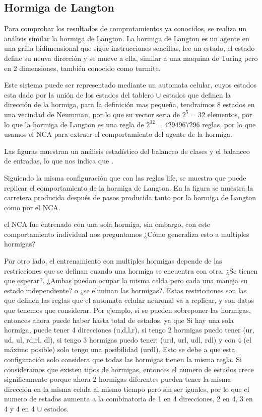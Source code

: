 \subsection{Hormiga de Langton}\label{sec:exp1_langton}

Para comprobar los resultados de comprotamientos ya conocidos, se realiza un análisis similar la hormiga de Langton. La hormiga de Langton es un agente en una grilla bidimensional que sigue instrucciones sencillas, lee un estado, el estado define su neuva dirección y se mueve a ella, similar a una maquina de Turing pero en 2 dimensiones, también conocido como turmite.

Este sistema puede ser representado mediante un automata celular, cuyos estados esta dado por la unión de los estados del tablero $\cup$ estados que definen la dirección de la hormiga, para la definición mas pequeña, tendraimos 8 estados en una vecindad de Neumman, por lo que su vector seria de $2^5 = 32$ elementos, por lo que la hormiga de Langton es una regla de $2^32 = 4294967296$ reglas, por lo que usamos el NCA para extraer el comportamiento del agente de la hormiga.

Las figuras \TODO{} muestran un análisis estadístico del balanceo de clases y el balanceo de entradas, lo que nos indica  que \TODO{}.

Siguiendo la misma configuración que con las reglas life, se muestra que puede replicar el comportamiento de la hormiga de Langton. En la figura \TODO{} se muestra la carretera producida después de  pasos producida tanto por la hormiga de Langton como por el NCA.

el NCA fue entrenado con una sola hormiga, sin embargo, con este comportamiento individual nos preguntamos ¿Cómo generaliza esto a multiples hormigas?

Por otro lado, el entrenamiento con multiples hormigas depende de las restricciones que se definan cuando una hormiga se encuentra con otra. ¿Se tienen que esperar?, ¿Ambas puedan ocupar la misma celda pero cada una maneja su estado independiente? o ¿se eliminan las hormigas?. Estas restricciones son las que definen las reglas que el automata celular neuronal va a replicar, y son datos que tenemos que considerar. Por ejemplo, si se pueden sobreponer las hormigas, entonces ahora puede haber hasta  total de estados. ya que Si hay una sola hormiga, puede tener 4 direcciones (u,d,l,r), si tengo 2 hormigas puedo tener (ur, ud, ul, rd,rl, dl), si tengo 3 hormigas puedo tener: (urd, url, udl,  rdl) y con 4 (el máximo posible) solo tengo una posibilidad (urdl). Esto se debe a que esta configuración solo considera que todas las hormigas tienen la misma regla. Si consideramos que existen tipos de hormigas, entonces el numero de estados crece significamente porque ahora 2 hormigas diferentes pueden tener la misma dirección en la misma celula al mismo tiempo pero sin ser iguales, por lo que el numero de estados aumenta a la combinatoria de 1 en 4 direcciones, 2 en 4, 3 en 4 y 4 en 4 $\cup$ estados.

